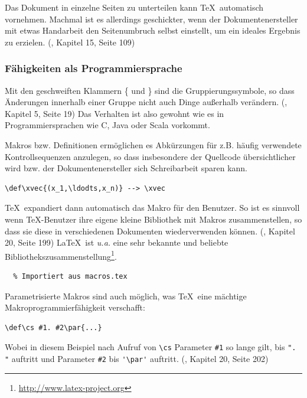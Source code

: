 Das Dokument in einzelne Seiten zu unterteilen kann \TeX~automatisch
vornehmen. Machmal ist es allerdings geschickter, wenn der Dokumentenersteller
mit etwas Handarbeit den Seitenumbruch selbst einstellt, um ein ideales
Ergebnis zu erzielen. (\cite{tex-a}, Kapitel 15, Seite 109)

\subsubsection{Fähigkeiten als Programmiersprache}

Mit den geschweiften Klammern \{ und \} sind die Gruppierungssymbole, so
dass Änderungen innerhalb einer Gruppe nicht auch Dinge außerhalb
verändern. (\cite{tex-a}, Kapitel 5, Seite 19)
Das Verhalten ist also gewohnt wie es in Programmiersprachen wie C,
Java oder Scala vorkommt.

Makros bzw. Definitionen ermöglichen es Abkürzungen für z.B. häufig
verwendete Kontrollsequenzen anzulegen, so dass insbesondere
der Quellcode übersichtlicher wird bzw. der Dokumentenersteller sich
Schreibarbeit sparen kann.

\begin{verbatim}
\def\xvec{(x_1,\ldodts,x_n)} --> \xvec
\end{verbatim}

\TeX~expandiert dann automatisch das Makro für den Benutzer.
So ist es sinnvoll wenn \TeX-Benutzer ihre eigene kleine Bibliothek mit
Makros zusammenstellen, so dass sie diese in verschiedenen Dokumenten
wiederverwenden können. (\cite{tex-a}, Kapitel 20, Seite 199)
\LaTeX~ist \emph{u.a.} eine sehr bekannte und beliebte
Bibliothekszusammenstellung\footnote{\url{http://www.latex-project.org}}.

\begin{verbatim}
  % Importiert aus macros.tex
\end{verbatim}

Parametrisierte Makros sind auch möglich, was \TeX~eine mächtige
Makroprogrammierfähigkeit verschafft:

\begin{verbatim}
\def\cs #1. #2\par{...}
\end{verbatim}

Wobei in diesem Beispiel nach Aufruf von \lstinline|\cs| Parameter
\lstinline|#1| so lange gilt,
bis \lstinline|". "| auftritt und Parameter \lstinline|#2|
bis \lstinline|'\par'| auftritt. (\cite{tex-a}, Kapitel 20, Seite 202)

